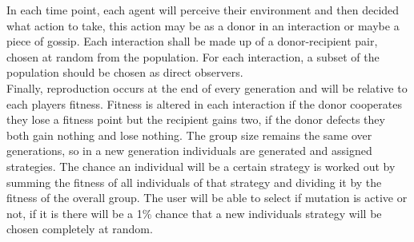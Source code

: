 \documentclass[twoside,twocolumn]{article}
\begin{document}
In each time point, each agent will perceive their environment and then decided what action to take, this action may be as a donor in an interaction or maybe a piece of gossip. Each interaction shall be made up of a donor-recipient pair, chosen at random from the population. For each interaction, a subset of the population should be chosen as direct observers.\\
Finally, reproduction occurs at the end of every generation and will be relative to each players fitness. Fitness is altered in each interaction if the donor cooperates they lose a fitness point but the recipient gains two, if the donor defects they both gain nothing and lose nothing. The group size remains the same over generations, so in a new generation individuals are generated and assigned strategies. The chance an individual will be a certain strategy is worked out by summing the fitness of all individuals of that strategy and dividing it by the fitness of the overall group. The user will be able to select if mutation is active or not, if it is there will be a 1\% chance that a new individuals strategy will be chosen completely at random.
\end{document}

